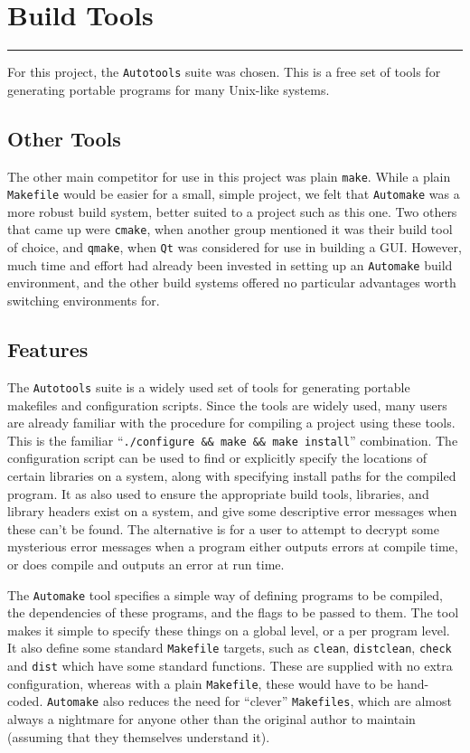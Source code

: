 \section{Build Tools}
\vspace{-2em}\rule{\textwidth}{1pt}\vspace{1em}

For this project, the \texttt{Autotools} suite was chosen.
This is a free set of tools for generating portable programs for many
Unix-like systems.

\subsection{Other Tools}
The other main competitor for use in this project was plain \texttt{make}.
While a plain \texttt{Makefile} would be easier for a small, simple project,
we felt that \texttt{Automake} was a more robust build system, better suited
to a project such as this one.
Two others that came up were \texttt{cmake}, when another group mentioned it
was their build tool of choice, and \texttt{qmake}, when \texttt{Qt} was
considered for use in building a GUI.
However, much time and effort had already been invested in setting up
an \texttt{Automake} build environment, and the other build systems offered
no particular advantages worth switching environments for.

\subsection{Features}
The \texttt{Autotools} suite is a widely used set of tools for generating
portable makefiles and configuration scripts.
Since the tools are widely used, many users are already familiar with
the procedure for compiling a project using these tools.
This is the familiar ``\texttt{./configure \&\& make \&\& make install}''
combination.
The configuration script can be used to find or explicitly specify the
locations of certain libraries on a system, along with specifying install
paths for the compiled program.
It as also used to ensure the appropriate build tools, libraries, and
library headers exist on a system, and give some descriptive error
messages when these can't be found.
The alternative is for a user to attempt to decrypt some mysterious
error messages when a program either outputs errors at compile time, or does
compile and outputs an error at run time.

The \texttt{Automake} tool specifies a simple way of defining programs to be
compiled, the dependencies of these programs, and the flags to be passed
to them.
The tool makes it simple to specify these things on a global level, or a
per program level.
It also define some standard \texttt{Makefile} targets, such as
\texttt{clean}, \texttt{distclean}, \texttt{check} and \texttt{dist}
which have some standard functions.
These are supplied with no extra configuration, whereas with a plain
\texttt{Makefile}, these would have to be hand-coded.
\texttt{Automake} also reduces the need for ``clever'' \texttt{Makefiles},
which are almost always a nightmare for anyone other than the original
author to maintain (assuming that they themselves understand it).

